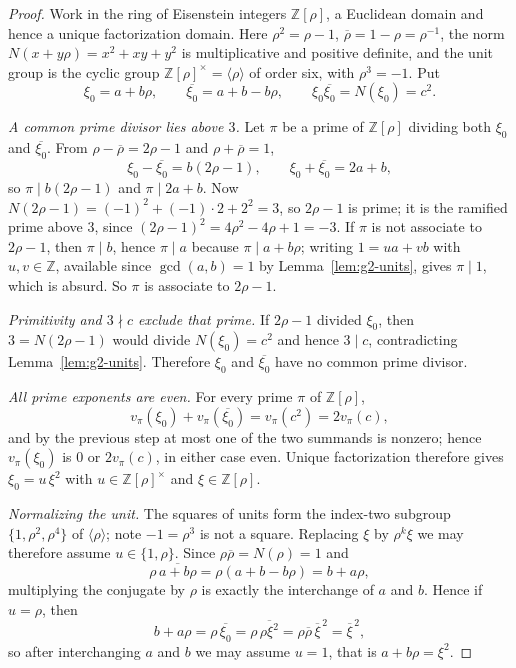 \documentclass[11pt]{amsart}
\theoremstyle{definition}
\theoremstyle{remark}
\newcommand{\Z}{\mathbb Z}
\begin{document}
\begin{proof}
Work in the ring of Eisenstein integers $\Z[\rho]$, a Euclidean domain and
hence a unique factorization domain.  Here $\rho^2=\rho-1$,
$\overline\rho=1-\rho=\rho^{-1}$, the norm $N(x+y\rho)=x^2+xy+y^2$ is
multiplicative and positive definite, and the unit group is the cyclic group
$\Z[\rho]^\times=\langle\rho\rangle$ of order six, with $\rho^3=-1$.  Put
\[
 \xi_0=a+b\rho,\qquad
 \overline{\xi_0}=a+b-b\rho,\qquad
 \xi_0\overline{\xi_0}=N(\xi_0)=c^2 .
\]

\emph{A common prime divisor lies above $3$.}  Let $\pi$ be a prime of
$\Z[\rho]$ dividing both $\xi_0$ and $\overline{\xi_0}$.  From
$\rho-\overline\rho=2\rho-1$ and $\rho+\overline\rho=1$,
\[
 \xi_0-\overline{\xi_0}=b(2\rho-1),\qquad
 \xi_0+\overline{\xi_0}=2a+b,
\]
so $\pi\mid b(2\rho-1)$ and $\pi\mid 2a+b$.  Now
$N(2\rho-1)=(-1)^2+(-1)\cdot2+2^2=3$, so $2\rho-1$ is prime; it is the
ramified prime above $3$, since $(2\rho-1)^2=4\rho^2-4\rho+1=-3$.  If $\pi$ is
not associate to $2\rho-1$, then $\pi\mid b$, hence $\pi\mid a$ because
$\pi\mid a+b\rho$; writing $1=ua+vb$ with $u,v\in\Z$, available since
$\gcd(a,b)=1$ by Lemma~\ref{lem:g2-units}, gives $\pi\mid1$, which is absurd.
So $\pi$ is associate to $2\rho-1$.

\emph{Primitivity and $3\nmid c$ exclude that prime.}  If $2\rho-1$ divided
$\xi_0$, then $3=N(2\rho-1)$ would divide $N(\xi_0)=c^2$ and hence $3\mid c$,
contradicting Lemma~\ref{lem:g2-units}.  Therefore $\xi_0$ and
$\overline{\xi_0}$ have no common prime divisor.

\emph{All prime exponents are even.}  For every prime $\pi$ of $\Z[\rho]$,
\[
 v_\pi(\xi_0)+v_\pi(\overline{\xi_0})=v_\pi(c^2)=2v_\pi(c),
\]
and by the previous step at most one of the two summands is nonzero; hence
$v_\pi(\xi_0)$ is $0$ or $2v_\pi(c)$, in either case even.  Unique
factorization therefore gives $\xi_0=u\,\xi^2$ with $u\in\Z[\rho]^\times$ and
$\xi\in\Z[\rho]$.

\emph{Normalizing the unit.}  The squares of units form the index-two subgroup
$\{1,\rho^2,\rho^4\}$ of $\langle\rho\rangle$; note $-1=\rho^3$ is not a
square.  Replacing $\xi$ by $\rho^k\xi$ we may therefore assume $u\in\{1,\rho\}$.
Since $\rho\overline\rho=N(\rho)=1$ and
\[
 \rho\,\overline{a+b\rho}=\rho(a+b-b\rho)=b+a\rho ,
\]
multiplying the conjugate by $\rho$ is exactly the interchange of $a$ and $b$.
Hence if $u=\rho$, then
\[
 b+a\rho=\rho\,\overline{\xi_0}
 =\rho\,\overline{\rho\xi^2}
 =\rho\overline\rho\,\overline\xi^{\,2}
 =\overline\xi^{\,2},
\]
so after interchanging $a$ and $b$ we may assume $u=1$, that is
$a+b\rho=\xi^2$.


\end{proof}
\end{document}
